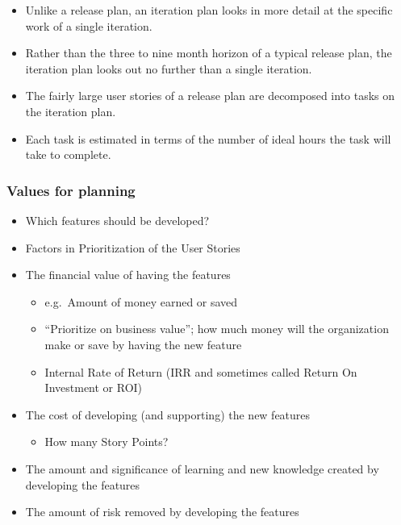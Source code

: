\begin{itemize}
\tightlist
\item
  Unlike a release plan, an iteration plan looks in more detail at the
  specific work of a single iteration.
\item
  Rather than the three to nine month horizon of a typical release plan,
  the iteration plan looks out no further than a single iteration.
\item
  The fairly large user stories of a release plan are decomposed into
  tasks on the iteration plan.
\item
  Each task is estimated in terms of the number of ideal hours the task
  will take to complete.
\end{itemize}

\hypertarget{values-for-planning}{%
\subsubsection{Values for planning}\label{values-for-planning}}

\begin{itemize}
\tightlist
\item
  Which features should be developed?
\item
  Factors in Prioritization of the User Stories
\item
  The financial value of having the features

  \begin{itemize}
  \tightlist
  \item
    e.g.~Amount of money earned or saved
  \item
    ``Prioritize on business value''; how much money will the
    organization make or save by having the new feature
  \item
    Internal Rate of Return (IRR and sometimes called Return On
    Investment or ROI)
  \end{itemize}
\item
  The cost of developing (and supporting) the new features

  \begin{itemize}
  \tightlist
  \item
    How many Story Points?
  \end{itemize}
\item
  The amount and significance of learning and new knowledge created by
  developing the features
\item
  The amount of risk removed by developing the features
\end{itemize}

